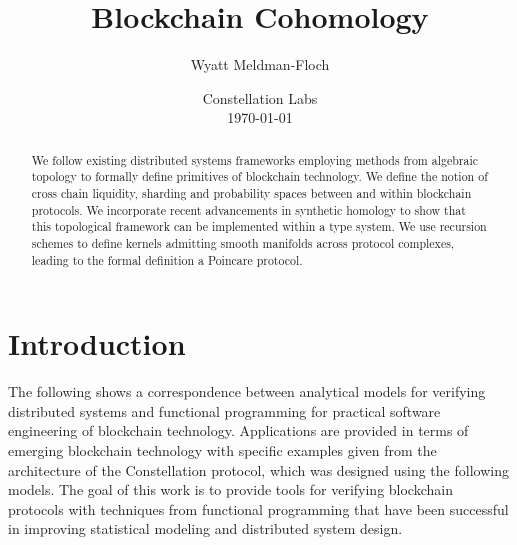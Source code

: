 \documentclass{article}
\title{Blockchain Cohomology}
\author{Wyatt Meldman-Floch}
\date{%
    Constellation Labs\\%
    \today}
\begin{document}
\maketitle

\begin{abstract}
We follow existing distributed systems frameworks employing methods from algebraic topology to formally define primitives of blockchain technology. We define the notion of cross chain liquidity, sharding and probability spaces between and within blockchain protocols. We incorporate recent advancements in synthetic homology to show that this topological framework can be implemented within a type system. We use recursion schemes to define kernels admitting smooth manifolds across protocol complexes, leading to the formal definition a Poincare protocol.
\end{abstract}

\section{Introduction}
The following shows a correspondence between analytical models for verifying distributed systems and functional programming for practical software engineering of blockchain technology. Applications are provided in terms of emerging blockchain technology with specific examples given from the architecture of the Constellation protocol, which was designed using the following models. The goal of this work is to provide tools for verifying blockchain protocols with techniques from functional programming that have been successful in improving statistical modeling and distributed system design.
\end{document}
